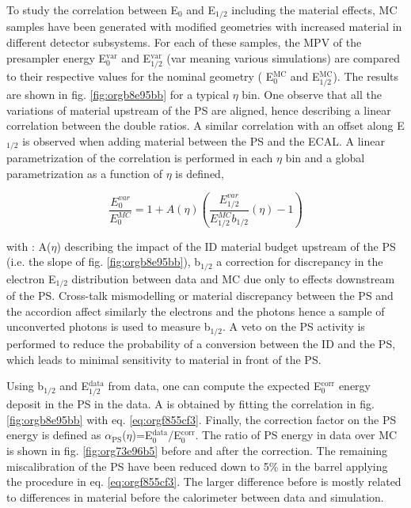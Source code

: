 To study the correlation between E\(_{\text{0}}\) and E\(_{\text{1/2}}\) including the material effects, MC samples have been generated with modified geometries with increased material in different detector subsystems.
For each of these samples, the MPV of the presampler energy E\(_{\text{0}}^{\text{var}}\) and E\(_{\text{1/2}}^{\text{var}}\) (var meaning various simulations) are compared to their respective values for the nominal geometry ( E\(_{\text{0}}^{\text{MC}}\) and E\(_{\text{1/2}}^{\text{MC}}\)).
The results are shown in fig. \ref{fig:orgb8e95bb} for a typical $\eta$ bin.
One observe that all the variations of material upstream of the PS are aligned, hence describing a linear correlation between the double ratios.
A similar correlation with an offset along E\(_{\text{1/2}}\) is observed when adding material between the PS and the ECAL.
A linear parametrization of the correlation is performed in each $\eta$ bin and a global parametrization as a function of $\eta$ is defined,

\begin{equation}
\label{eq:orgf855cf3}
\frac{E_0^{var}}{E_0^{MC}} = 1 + A(\eta) \left( \frac{E_{1/2}^{var}}{E^{MC}_{1/2}b_{1/2}}(\eta) -1 \right)
\end{equation}

with : A($\eta$) describing the impact of the ID  material budget upstream of the PS (i.e. the slope of fig. \ref{fig:orgb8e95bb}), b\(_{\text{1/2}}\) a correction for discrepancy in the electron E\(_{\text{1/2}}\) distribution between data and MC due only to effects downstream of the PS.
Cross-talk mismodelling or material discrepancy between the PS and the accordion affect similarly the electrons and the photons hence a sample of unconverted photons is used to measure b\(_{\text{1/2}}\).
A veto on the PS activity is performed to reduce the probability of a conversion between the ID and  the PS, which leads to minimal sensitivity to material in front of the PS.

Using b\(_{\text{1/2}}\) and E\(_{\text{1/2}}^{\text{data}}\) from data, one can compute the expected E\(_{\text{0}}^{\text{corr}}\) energy deposit in the PS in the data.
A is obtained by fitting the correlation in fig. \ref{fig:orgb8e95bb} with eq. \ref{eq:orgf855cf3}.
Finally, the correction factor on the PS energy is defined as \(\alpha_{\text{PS}}\)($\eta$)=E\(_{\text{0}}^{\text{data}}\)/E\(_{\text{0}}^{\text{corr}}\).
The ratio of PS energy in data over MC is shown in fig. \ref{fig:org73e96b5} before and after the correction.
The remaining miscalibration of the PS have been reduced down to 5\% in the barrel applying the procedure in eq. \ref{eq:orgf855cf3}.
The larger difference before is mostly related to differences in material before the calorimeter between data and simulation.


